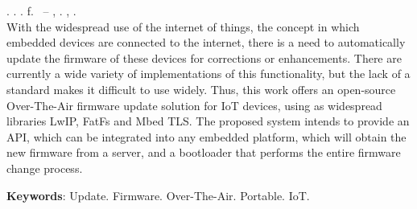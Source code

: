 
\begin{resumo}[ABSTRACT]
\begin{SingleSpacing}

\imprimirautorcitacao. \imprimirtitleabstract. \imprimirdata. \pageref {LastPage} f. \imprimirprojeto\ – \imprimirprograma, \imprimirinstituicao. \imprimirlocal, \imprimirdata.\\

With the widespread use of the internet of things, the concept in which embedded devices are connected to the internet, there is a need to automatically update the firmware of these devices for corrections or enhancements. There are currently a wide variety of implementations of this functionality, but the lack of a standard makes it difficult to use widely.
Thus, this work offers an open-source Over-The-Air firmware update solution for IoT devices, using as widespread libraries LwIP, FatFs and Mbed TLS.
The proposed system intends to provide an API, which can be integrated into any embedded platform, which will obtain the new firmware from a server, and a bootloader that performs the entire firmware change process.

\textbf{Keywords}: Update. Firmware. Over-The-Air. Portable. IoT.

\end{SingleSpacing}
\end{resumo}

